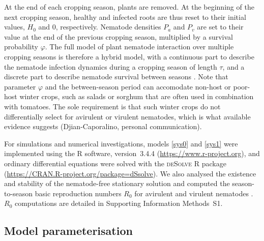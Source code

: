 {{{{\label{phi}
At the end of each cropping season, plants are removed. At the
beginning of the next cropping season, healthy and infected roots are
thus reset to their initial values, $H_{0}$ and 0,
respectively. Nematode densities $P_{a}$ and $P_{v}$ are set to their
value at the end of the previous cropping season, multiplied by a
survival probability $\varphi$.  The full model of plant nematode
interaction over multiple cropping seasons is therefore a hybrid
model, with a continuous part to describe the nematode infection
dynamics during a cropping season of length $\tau$, and a discrete
part to describe nematode survival between seasons
\citep{Mailleret2009,Mailleret2012}. Note that parameter
  $\varphi$ and the between-season period can accomodate non-host or
  poor-host winter crops, such as salads or sorghum that are often
  used in combination with tomatoes.  The sole requirement is that
  such winter crops do not differentially select for avirulent or
  virulent nematodes, which is what available evidence suggests
  (Djian-Caporalino, personal communication).

For simulations and numerical investigations, models \eqref{sys0} and
\eqref{sys1} were implemented using the R software,
  version~3.4.4
(\href{https://www.r-project.org}{https://www.r-project.org}), and
ordinary differential equations were solved with the \textsc{deSolve}
R package \linebreak
(\href{https://CRAN.R-project.org/package=deSolve}{https://CRAN.R-project.org/package=dSsolve}).
We also analysed the existence and stability of the nematode-free
stationary solution and computed the season-to-season basic
reproduction numbers $R_{0}$ for avirulent and virulent nematodes
\citep{Mailleret2012}. $R_{0}$ computations are detailed in Supporting
Information Methods~S1.

\subsection{Model parameterisation}

}}}}
